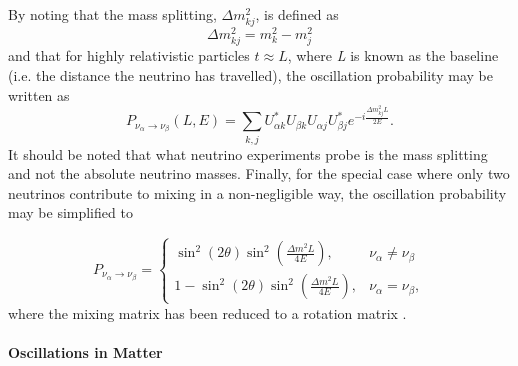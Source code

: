 By noting that the mass splitting, $\Delta m^2_{kj}$, is defined as 
\begin{equation}
    \Delta m^2_{kj} = m_k^2 - m_j^2
\end{equation}
and that for highly relativistic particles $t \approx L$, where \textit{L} is known as the baseline (i.e. the distance the neutrino has travelled), the oscillation probability may be written as 
\begin{equation}
     P_{\nu_\alpha \rightarrow \nu_\beta}(L,E) = \sum_{k,j} U^*_{\alpha k} U_{\beta k} U_{\alpha j} U^*_{\beta j} e^{-i\frac{\Delta m^2_{kj}L}{2E}}.
\end{equation}
It should be noted that what neutrino experiments probe is the mass splitting and not the absolute neutrino masses. Finally, for the special case where only two neutrinos contribute to mixing in a non-negligible way, the oscillation probability may be simplified to

\begin{equation}
  P_{\nu_\alpha \rightarrow \nu_\beta}=\begin{cases}
    \sin^2(2\theta)\sin^2{(\frac{\Delta m^2L}{4E})}, & \nu_\alpha \neq \nu_\beta \\
    1 - \sin^2(2\theta)\sin^2{(\frac{\Delta m^2L}{4E})}, & \nu_{\alpha} = \nu_{\beta},
  \end{cases}
  \label{eqn:osc_probability}
\end{equation}
where the mixing matrix has been reduced to a rotation matrix \cite{Fundamentals_of_Neutrino_Physics_and_Astrophysics}. 

\paragraph{Oscillations in Matter}

